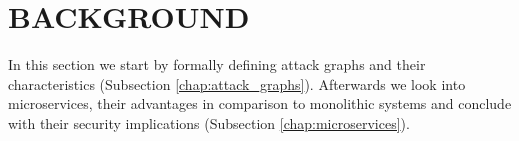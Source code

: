 \section{BACKGROUND}

In this section we start by formally defining attack graphs and their characteristics (Subsection \ref{chap:attack_graphs}). Afterwards we look into microservices, their advantages in comparison to monolithic systems and conclude with their security implications (Subsection \ref{chap:microservices}).



